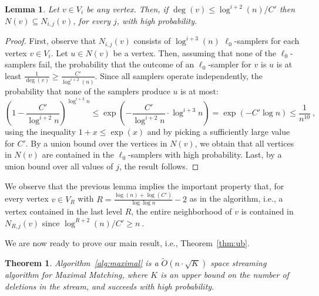 \documentclass[11pt,a4paper]{article}
\newtheorem{theorem}{Theorem}
\newtheorem{lemma}{Lemma}
\begin{document}
\begin{lemma} \label{lem:technical-1}
 Let $v \in V_i$ be any vertex. Then, if $\deg(v) \le \log^{i+2}(n)/C'$ then $N(v) \subseteq N_{i,j}(v)$, for every $j$, with high probability.
\end{lemma}
\begin{proof}
    First, observe  that $N_{i,j}(v)$ consists of $\log^{i+3}(n)$ $\ell_0$-samplers for each vertex $v \in V_i$. Let $u \in N(v)$ be a vertex. Then, assuming that none of the $\ell_0$-samplers fail, the probability that the outcome of an $\ell_0$-sampler for $v$ is $u$ is at least $\frac{1}{\deg(v)} \ge \frac{C'}{\log^{i+2}(n)}$. Since all samplers operate independently, the probability that none of the samplers produce $u$ is at most:
$$\left( 1 -  \frac{C'}{\log^{i+2} n} \right)^{\log^{i+3}  n} \le \exp \left(- \frac{C'}{\log^{i+2} n} \cdot  \log^{i+3} n \right) = \exp \left( - C' \log n \right) \le \frac{1}{n^{10}} \ ,$$
using the inequality $1+x \le \exp(x)$ and by picking a sufficiently large value for $C'$. By a union bound over the vertices in $N(v)$, we obtain that all vertices in $N(v)$ are contained in the $\ell_0$-samplers with high probability. Last, by a union bound over all values of $j$, the result follows.
\end{proof}


We observe that the previous lemma implies the important property that, for every vertex $v \in V_{R}$ with $R = \frac{\log(n) + \log(C')}{\log \log n} - 2$ as in the algorithm, i.e., a vertex contained in the last level $R$, the entire neighborhood of $v$ is contained in $N_{R,j}(v)$ since
$\log^{R+2}(n) / C' \ge n \ . $


We are now ready to prove our main result, i.e., Theorem~\ref{thm:ub}.


\setcounter{thmsaved}{\value{theorem}}
\setcounter{theorem}{\value{counterUB}}
\addtocounter{theorem}{-1}

\begin{theorem}
 Algorithm~\ref{alg:maximal} is a $\tilde{O}(n \cdot \sqrt{K})$ space streaming algorithm for \textsf{Maximal Matching}, where $K$ is an upper bound on the number of deletions in the stream, and succeeds with high probability.
\end{theorem}
\setcounter{theorem}{\value{thmsaved}} 
\end{document}
